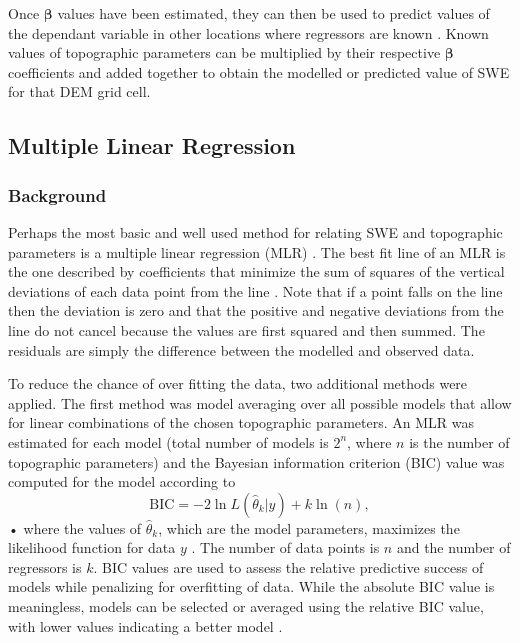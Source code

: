 \documentclass[12pt]{article}
\begin{document}
Once $\bm{\beta}$ values have been estimated, they can then be used to predict values of the dependant variable in other locations where regressors are known \citep{Davis1986}. Known values of topographic parameters can be multiplied by their respective $\bm{\beta}$ coefficients and added together to obtain the modelled or predicted value of SWE for that DEM grid cell.


\subsection{Multiple Linear Regression}
\label{sec:MLR}

\subsubsection{Background}

Perhaps the most basic and well used method for relating SWE and topographic parameters is a multiple linear regression (MLR) \citep[e.g.][]{Cohen2013}. The best fit line of an MLR is the one described by coefficients that minimize the sum of squares of the vertical deviations of each data point from the line \citep{Davis1986}. Note that if a point falls on the line then the deviation is zero and that the positive and negative deviations from the line do not cancel because the values are first squared and then summed. The residuals are simply the difference between the modelled and observed data. 

To reduce the chance of over fitting the data, two additional methods were applied. The first method was model averaging over all possible models that allow for linear combinations of the chosen topographic parameters. An MLR was estimated for each model (total number of models is $2^n$, where $n$ is the number of topographic parameters) and the Bayesian information criterion (BIC) value was computed for the model according to
\begin{equation}
\textrm{BIC} = -2 \ln L(\hat\theta_k  | y) + k \ln(n),
\end{equation}•
where the values of $\hat \theta_k$, which are the model parameters, maximizes the likelihood function for data $y$ \citep{Burnham2004}. The number of data points is $n$ and the number of regressors is $k$. BIC values are used to assess the relative predictive success of models while penalizing for overfitting of data. While the absolute BIC value is meaningless, models can be selected or averaged using the relative BIC value, with lower values indicating a better model \citep{Burnham2004}. 
\end{document}
